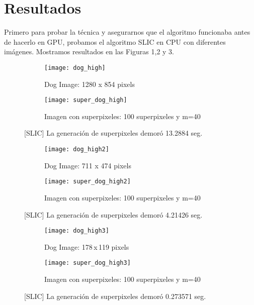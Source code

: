 \documentclass[11pt, oneside]{article}   	%
\begin{document}
\section{Resultados}

Primero para probar la t\'ecnica y asegurarnos que el algoritmo funcionaba antes de hacerlo en GPU, probamos el algoritmo SLIC en CPU con diferentes im\'agenes. Mostramos resultados en las Figuras 1,2 y 3.


\begin{figure}
\label{fig1}
\centering
\begin{subfigure}[b]{0.49\textwidth}
\label{dog1sub1}
\caption{Dog Image: 1280 x 854 pixels}
\texttt{[image: dog\_high]}
\end{subfigure}
\begin{subfigure}[b]{0.49\textwidth}
\label{dog1sub2}
\caption{Imagen con superpixeles: 100 superpixeles y m=40}
\texttt{[image: super\_dog\_high]}
\end{subfigure}
\caption{[SLIC] La generaci\'on de superpixeles demor\'o 13.2884 seg.}
\end{figure}

\begin{figure}
\label{fig2}
\centering
\begin{subfigure}[b]{0.49\textwidth}
\label{dog2sub1}
\caption{Dog Image: 711 x 474 pixels}
\texttt{[image: dog\_high2]}
\end{subfigure}
\begin{subfigure}[b]{0.49\textwidth}
\label{dog2sub2}
\caption{Imagen con superpixeles: 100 superpixeles y m=40}
\texttt{[image: super\_dog\_high2]}
\end{subfigure}
\caption{[SLIC] La generaci\'on de superpixeles demor\'o 4.21426 seg.}
\end{figure}


\begin{figure}
\label{fig3}
\centering
\begin{subfigure}[b]{0.49\textwidth}
\label{dog3sub1}
\caption{Dog Image: 178 x 119 pixels}
\texttt{[image: dog\_high3]}
\end{subfigure}
\begin{subfigure}[b]{0.49\textwidth}
\label{dog3sub2}
\caption{Imagen con superpixeles: 100 superpixeles y m=40}
\texttt{[image: super\_dog\_high3]}
\end{subfigure}
\caption{[SLIC] La generaci\'on de superpixeles demor\'o 0.273571 seg.}
\end{figure}



{}

\end{document}
